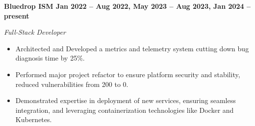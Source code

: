 \vspace{0.1cm}
\textbf{Bluedrop ISM \hfill Jan 2022 -- Aug 2022, May 2023 -- Aug 2023, Jan 2024 -- present} \par
\textit{Full-Stack Developer} \par
\begin{itemize}
	\item Architected and Developed a metrics and telemetry system cutting down bug diagnosis time by 25\%.
    \item Performed major project refactor to ensure platform security and stability, reduced vulnerabilities from 200 to 0.
    \item Demonstrated expertise in deployment of new services, ensuring seamless integration, and leveraging containerization technologies like Docker and Kubernetes.
\end{itemize} \par
